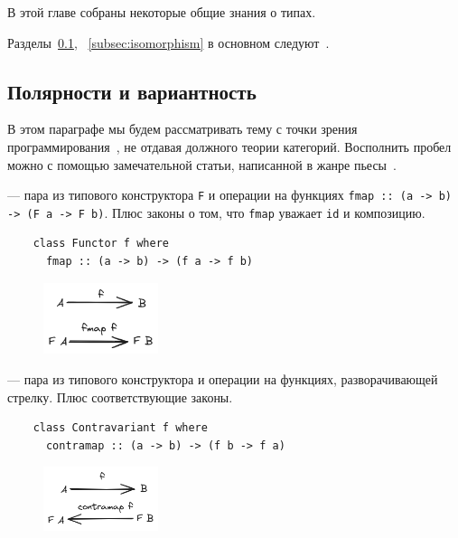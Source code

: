 В этой главе собраны некоторые общие знания о типах.

Разделы~\ref{subsec:variance}, ~\ref{subsec:isomorphism} в основном следуют~\cite[глава 1]{maguire-types}.

\subsection{Полярности и вариантность} \label{subsec:variance} %

В этом параграфе мы будем рассматривать тему с точки зрения программирования~\cite[глава 3]{maguire-types}, не отдавая должного теории категорий.
Восполнить пробел можно с помощью замечательной статьи, написанной в жанре пьесы~\cite{hinze2012functional}.

 --- пара из типового конструктора \texttt{F} и операции на функциях \texttt{fmap :: (a -> b) -> (F a -> F b)}.
Плюс законы о том, что \texttt{fmap} уважает \texttt{id} и композицию.

\begin{verbatim}
    class Functor f where
      fmap :: (a -> b) -> (f a -> f b)
\end{verbatim}

\begin{figure}[H]
    \centering
    \includegraphics[width=0.3\textwidth]{figs/functor}
\end{figure}

 --- пара из типового конструктора и операции на функциях, разворачивающей стрелку.
Плюс соответствующие законы.

\begin{verbatim}
    class Contravariant f where
      contramap :: (a -> b) -> (f b -> f a)
\end{verbatim}

\begin{figure}[H]
    \centering
    \includegraphics[width=0.3\textwidth]{figs/contra-functor}
\end{figure}

